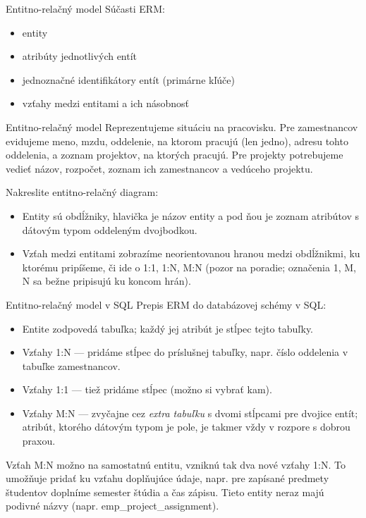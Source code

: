 \documentclass[12pt]{beamer}
\begin{document}
\begin{frame}[fragile]{Entitno-relačný model}
Súčasti ERM:
\begin{itemize}
\item entity
\item atribúty jednotlivých entít
\item jednoznačné identifikátory entít (primárne kľúče)
\item vzťahy medzi entitami a ich násobnosť
\end{itemize}
\end{frame}


\begin{frame}[fragile]{Entitno-relačný model}
Reprezentujeme situáciu na pracovisku. Pre zamestnancov evidujeme meno, mzdu, 
oddelenie, na ktorom pracujú (len jedno), adresu tohto oddelenia, a zoznam projektov, na ktorých pracujú.
Pre projekty potrebujeme vedieť názov, rozpočet, zoznam ich zamestnancov a vedúceho projektu.

Nakreslite entitno-relačný diagram:
\begin{itemize}
\item Entity sú obdĺžniky, hlavička je názov entity a pod ňou je zoznam atribútov s dátovým typom oddeleným dvojbodkou.
\item Vzťah medzi entitami zobrazíme neorientovanou hranou medzi obdĺžnikmi, ku ktorému pripíšeme, či ide o 1:1, 1:N, M:N
(pozor na poradie; označenia 1, M, N sa bežne pripisujú ku koncom hrán).
\end{itemize}
\end{frame}

\begin{frame}[fragile]{Entitno-relačný model v SQL}
Prepis ERM do databázovej schémy v SQL: 
\begin{itemize}
\item Entite zodpovedá tabuľka; každý jej atribút je stĺpec tejto tabuľky.
\item Vzťahy 1:N --- pridáme stĺpec do príslušnej tabuľky, napr. číslo oddelenia v tabuľke zamestnancov.
\item Vzťahy 1:1 --- tiež pridáme stĺpec (možno si vybrať kam).
\item Vzťahy M:N --- zvyčajne cez \emph{extra tabuľku} s dvomi stĺpcami pre dvojice entít;
atribút, ktorého dátovým typom je pole, je takmer vždy v rozpore s dobrou praxou.
\end{itemize}
Vzťah M:N možno  na samostatnú entitu, vzniknú tak dva nové vzťahy 1:N.
To umožňuje pridať ku vzťahu doplňujúce údaje, napr. pre zapísané predmety študentov doplníme semester štúdia a čas zápisu.
Tieto  entity neraz majú podivné názvy (napr. emp\_project\_assignment).
\end{frame}
\end{document}
